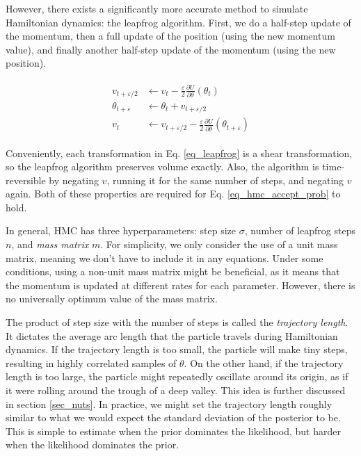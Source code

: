 \documentclass[12pt]{article}
\begin{document}
{However, there exists a significantly more accurate method to simulate Hamiltonian dynamics: the leapfrog algorithm. \cite{hmc} First, we do a half-step update of the momentum, then a full update of the position (using the new momentum value), and finally another half-step update of the momentum (using the new position).

\begin{align}
\begin{split}
v_{t+\varepsilon/2} &\leftarrow v_t - \frac{\varepsilon}{2} \frac{\partial U}{\partial \theta}(\theta_t) \\
\theta_{t+\varepsilon} &\leftarrow \theta_t + v_{t+\varepsilon/2} \\
v_t &\leftarrow v_{t+\varepsilon/2} - \frac{\varepsilon}{2} \frac{\partial U}{\partial \theta}(\theta_{t+\varepsilon})
\end{split}
\label{eq_leapfrog}
\end{align}

Conveniently, each transformation in Eq. \ref{eq_leapfrog} is a shear transformation, so the leapfrog algorithm preserves volume exactly. Also, the algorithm is time-reversible by negating $v$, running it for the same number of steps, and negating $v$ again. Both of these properties are required for Eq. \ref{eq_hmc_accept_prob} to hold. \cite{hmc}

In general, HMC has three hyperparameters: step size $\sigma$, number of leapfrog steps $n$, and \textit{mass matrix} $m$. For simplicity, we only consider the use of a unit mass matrix, meaning we don't have to include it in any equations. Under some conditions, using a non-unit mass matrix might be beneficial, as it means that the momentum is updated at different rates for each parameter. However, there is no universally optimum value of the mass matrix.

The product of step size with the number of steps is called the \textit{trajectory length}. It dictates the average arc length that the particle travels during Hamiltonian dynamics. If the trajectory length is too small, the particle will make tiny steps, resulting in highly correlated samples of $\theta$. On the other hand, if the trajectory length is too large, the particle might repeatedly oscillate around its origin, as if it were rolling around the trough of a deep valley. This idea is further discussed in section \ref{sec_nuts}. In practice, we might set the trajectory length roughly similar to what we would expect the standard deviation of the posterior to be. \cite{bnn_posterior} This is simple to estimate when the prior dominates the likelihood, but harder when the likelihood dominates the prior.

}
\end{document}
